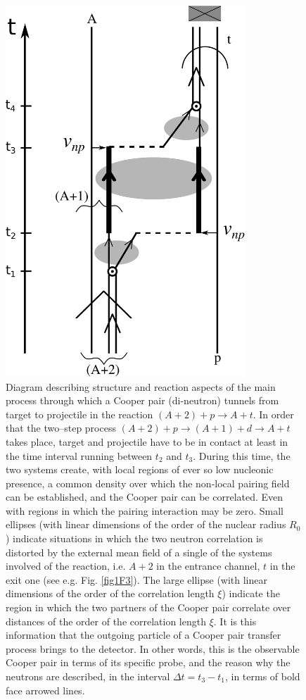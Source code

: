     \begin{figure}
    \centerline{\includegraphics*[width=9cm,angle=0]{C8/figsC8/Fig8_v2}}
    	\caption{Diagram describing structure and reaction aspects of the main process through which a Cooper pair (di-neutron) tunnels from target to projectile in the reaction $(A+2)+p\to A+t$. In order that the two--step process $(A+2)+p\to(A+1)+d\to A+t$ takes place, target and projectile have to be in contact at least in the time interval running between $t_2$ and $t_3$. During this time, the two systems create, with local regions of ever so low nucleonic presence, a common density over which the non-local pairing field can be established, and the Cooper pair can be correlated. Even with regions in which the pairing interaction may be zero. Small ellipses (with linear dimensions of the order of the nuclear radius $R_0$) indicate situations in which the two neutron correlation is distorted by the external mean field of a single of the systems involved of the reaction, i.e. $A+2$ in the entrance channel, $t$ in the exit one (see e.g. Fig. \ref{fig1F3}). The large ellipse (with linear dimensions of the order of the correlation length $\xi$) indicate the region in which the two partners of the Cooper pair correlate over distances of the order of the correlation length $\xi$. It is this information that the outgoing particle of a Cooper pair transfer process brings to the detector. In other words, this is the observable Cooper pair in terms of its specific probe, and the reason why the neutrons are described, in the interval $\Delta t=t_3-t_1$, in terms of bold face arrowed lines.}\label{fig6.5.5}
    \end{figure}
